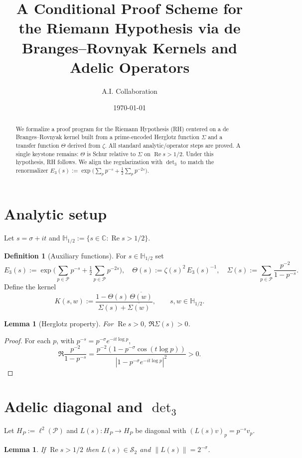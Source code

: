 \documentclass[11pt]{article}
\title{A Conditional Proof Scheme for the Riemann Hypothesis via de Branges--Rovnyak Kernels and Adelic Operators}
\author{A.I. Collaboration}
\date{\today}
\newcommand{\C}{\mathbb{C}}
\newcommand{\Pset}{\mathcal{P}}
\newcommand{\ReS}{\operatorname{Re}}
\newcommand{\Si}{\Sigma}
\newcommand{\Th}{\Theta}
\newcommand{\HS}{\mathcal{S}_2}
\newcommand{\detm}[1]{\det\nolimits_{#1}}
\theoremstyle{plain}
\newtheorem{lemma}[theorem]{Lemma}
\theoremstyle{definition}
\newtheorem{definition}[theorem]{Definition}
\theoremstyle{remark}
\begin{document}
\maketitle

\begin{abstract}
We formalize a proof program for the Riemann Hypothesis (RH) centered on a de Branges--Rovnyak kernel built from a prime-encoded Herglotz function $\Si$ and a transfer function $\Th$ derived from $\zeta$. All standard analytic/operator steps are proved. A single keystone remains: $\Th$ is Schur relative to $\Si$ on $\ReS s>1/2$. Under this hypothesis, RH follows. We align the regularization with $\detm{3}$ to match the renormalizer $E_3(s) := \exp\big(\sum_p p^{-s} + \tfrac12 \sum_p p^{-2s}\big)$.
\end{abstract}

\section{Analytic setup}
Let $s=\sigma+it$ and $\mathbb{H}_{1/2}:=\{ s\in\C: \ReS s>1/2\}$.

\begin{definition}[Auxiliary functions]
For $s\in\mathbb{H}_{1/2}$ set
\[
E_3(s):=\exp\Big(\sum_{p\in\Pset} p^{-s} + \tfrac12\sum_{p\in\Pset} p^{-2s}\Big),\quad
\Th(s):=\zeta(s)^2\,E_3(s)^{-1},\quad
\Si(s):=\sum_{p\in\Pset} \frac{p^{-2}}{1-p^{-s}}.
\]
Define the kernel
\[
K(s,w):=\frac{1-\Th(s)\,\overline{\Th(w)}}{\Si(s)+\overline{\Si(w)}},\qquad s,w\in\mathbb{H}_{1/2}.
\]
\end{definition}

\begin{lemma}[Herglotz property]\label{lem:herglotz}
For $\ReS s>0$, $\Re \Si(s)>0$.
\end{lemma}
\begin{proof}
For each $p$, with $p^{-s}=p^{-\sigma}e^{-it\log p}$,
\[\Re\frac{p^{-2}}{1-p^{-s}}=\frac{p^{-2}(1-p^{-\sigma}\cos(t\log p))}{|1-p^{-\sigma}e^{-it\log p}|^2}>0.\]
\end{proof}

\section{Adelic diagonal and $\detm{3}$}
Let $H_P:=\ell^2(\Pset)$ and $L(s):H_P\to H_P$ be diagonal with $(L(s)v)_p=p^{-s}v_p$.

\begin{lemma}\label{lem:HS}
If $\ReS s>1/2$ then $L(s)\in \HS$ and $\|L(s)\|=2^{-\sigma}$.
\end{lemma}
\end{document}
